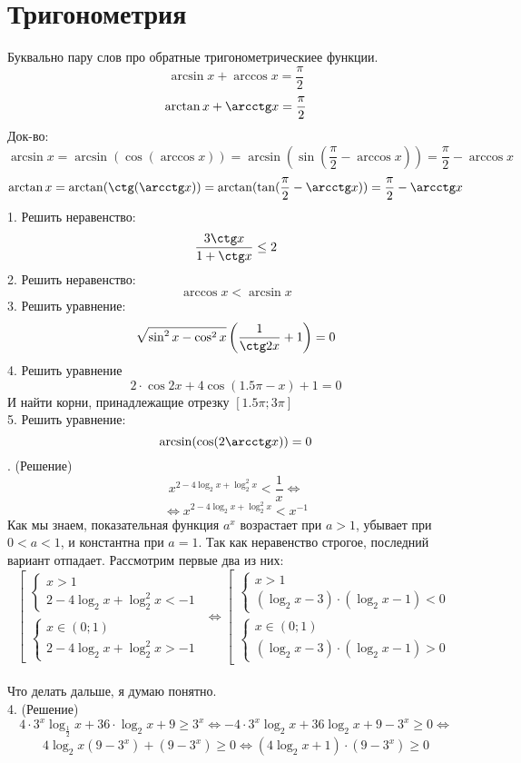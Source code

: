 \documentclass{article}
\begin{document}
\section*{Тригонометрия}
Буквально пару слов про обратные тригонометрическиее функции.
\[ \arcsin x + \arccos x = \frac{\pi}{2} \]
\[ \arctan x + \arcctg x = \frac{\pi}{2} \]
Док-во:
\[ \arcsin x = \arcsin (\cos (\arccos x)) = \arcsin (\sin (\frac{\pi}{2} - \arccos x))
= \frac{\pi}{2} - \arccos x\]
\[ \arctan x = \arctan (\ctg (\arcctg x)) = \arctan (\tan(\frac{\pi}{2} - \arcctg x))
 = \frac{\pi}{2} - \arcctg x \]
1. Решить неравенство:
\[ \frac{3\ctg x}{1 + \ctg x} \leq 2\]
2. Решить неравенство:
\[ \arccos x < \arcsin x \]
3. Решить уравнение:
\[ \sqrt{\sin^2 x  - \cos^2 x} \left( \frac{1}{\ctg 2x} + 1\right) = 0\]
4. Решить уравнение
\[ 2\cdot \cos 2x + 4 \cos(1.5\pi - x) + 1 = 0 \]
И найти корни, принадлежащие отрезку $[1.5\pi; 3\pi]$
\\
5. Решить уравнение:
\[ \arcsin(\cos(2\arcctg x)) = 0 \]
. (Решение) 
\[ x^{2 - 4\log_2 x + \log^2_2 x} < \frac{1}{x} \Leftrightarrow \]
\[ \Leftrightarrow x^{2 - 4\log_2 x + \log^2_2 x} < x^{-1} \]
Как мы знаем, показательная функция $a^x$ возрастает при $a > 1$,
убывает при $0 < a < 1$, и константна при $a = 1$. Так как неравенство строгое,
последний вариант отпадает. Рассмотрим первые два из них: \\
\begin{equation*}
\left[
\begin{gathered}
\begin{cases}
x > 1 \\
2 -4\log_2 x + \log^2_2 x < -1
\end{cases}
\\
\begin{cases}
x \in (0; 1) \\
2 -4\log_2 x + \log^2_2 x > -1
\end{cases}
\end{gathered}
\right.
\Leftrightarrow
\left[
\begin{gathered}
\begin{cases}
x > 1 \\
(\log_2 x - 3) \cdot (\log_2 x - 1) < 0
\end{cases}
\\
\begin{cases}
x \in (0; 1) \\
(\log_2 x - 3) \cdot (\log_2 x - 1) > 0
\end{cases}
\end{gathered}
\right.
\end{equation*}
\\
Что делать дальше, я думаю понятно.
\\
4. (Решение) \\
\[ 4 \cdot 3^x \log_{\frac{1}{2}} x + 36 \cdot \log_2 x + 9 \geq 3^x \Leftrightarrow 
 -4 \cdot 3^x \log_2 x + 36 \log_2 x + 9 - 3^x \geq 0 \Leftrightarrow\]
\[ 4 \log_2 x (9 - 3^x) + (9 - 3^x) \geq 0 \Leftrightarrow 
(4\log_2 x + 1) \cdot (9 - 3^x) \geq 0\]
\end{document}
